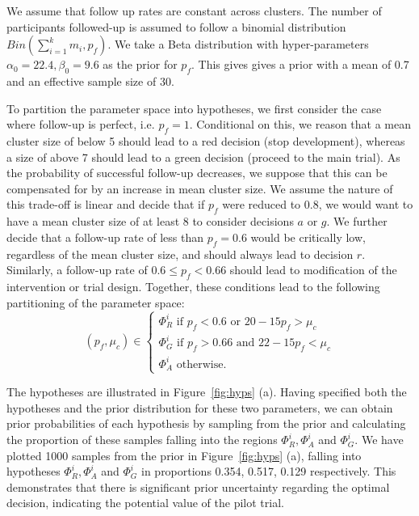 \documentclass[AMA,STIX1COL]{WileyNJD-v2}
\begin{document}
We assume that follow up rates are constant across clusters. The number of participants followed-up is assumed to follow a binomial distribution $Bin(\sum_{i=1}^{k} m_{i}, p_{f})$. We take a Beta distribution with hyper-parameters $\alpha_{0} = 22.4, \beta_{0} = 9.6$ as the prior for $p_{f}$. This gives gives a prior with a mean of 0.7 and an effective sample size of 30.

To partition the parameter space into hypotheses, we first consider the case where follow-up is perfect, i.e. $p_{f} = 1$. Conditional on this, we reason that a mean cluster size of below 5 should lead to a red decision (stop development), whereas a size of above 7 should lead to a green decision (proceed to the main trial). As the probability of successful follow-up decreases, we suppose that this can be compensated for by an increase in mean cluster size. We assume the nature of this trade-off is linear and decide that if $p_{f}$ were reduced to 0.8, we would want to have a mean cluster size of at least 8 to consider decisions $a$ or $g$.  We further decide that a follow-up rate of less than $p_{f} = 0.6$ would be critically low, regardless of the mean cluster size, and should always lead to decision $r$. Similarly, a follow-up rate of $0.6 \leq p_{f} < 0.66$ should lead to modification of the intervention or trial design. Together, these conditions lead to the following partitioning of the parameter space:
\begin{equation}
  (p_{f}, \mu_{c}) \in \begin{cases}
               \Phi^i_R \text{ if } p_{f} < 0.6 \text{ or } 20-15p_{f} > \mu_{c} \\
               \Phi^i_G \text{ if } p_{f} > 0.66 \text{ and } 22-15p_{f} < \mu_{c} \\
               \Phi^i_A \text{ otherwise.}
            \end{cases}
\end{equation}

The hypotheses are illustrated in Figure~\ref{fig:hyps} (a). Having specified both the hypotheses and the prior distribution for these two parameters, we can obtain prior probabilities of each hypothesis by sampling from the prior and calculating the proportion of these samples falling into the regions $\Phi^i_R, \Phi^i_A$ and $\Phi^i_G$. We have plotted 1000 samples from the prior in Figure~\ref{fig:hyps} (a), falling into hypotheses  $\Phi^i_R, \Phi^i_A$ and $\Phi^i_G$ in proportions 0.354, 0.517, 0.129 respectively. This demonstrates that there is significant prior uncertainty regarding the optimal decision, indicating the potential value of the pilot trial.
\end{document}
